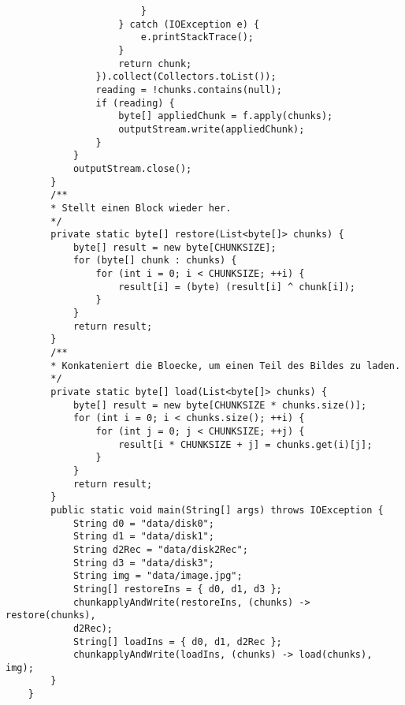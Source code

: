 \documentclass[ngerman]{fbi-aufgabenblatt}
\begin{document}
\begin{lstlisting}
						}
					} catch (IOException e) {
						e.printStackTrace();
					}
					return chunk;
				}).collect(Collectors.toList());
				reading = !chunks.contains(null);
				if (reading) {
					byte[] appliedChunk = f.apply(chunks);
					outputStream.write(appliedChunk);
				}
			}
			outputStream.close();
		}
		/**
		* Stellt einen Block wieder her.
		*/
		private static byte[] restore(List<byte[]> chunks) {
			byte[] result = new byte[CHUNKSIZE];
			for (byte[] chunk : chunks) {
				for (int i = 0; i < CHUNKSIZE; ++i) {
					result[i] = (byte) (result[i] ^ chunk[i]);
				}
			}
			return result;
		}
		/**
		* Konkateniert die Bloecke, um einen Teil des Bildes zu laden.
		*/
		private static byte[] load(List<byte[]> chunks) {
			byte[] result = new byte[CHUNKSIZE * chunks.size()];
			for (int i = 0; i < chunks.size(); ++i) {
				for (int j = 0; j < CHUNKSIZE; ++j) {
					result[i * CHUNKSIZE + j] = chunks.get(i)[j];
				}
			}
			return result;
		}
		public static void main(String[] args) throws IOException {
			String d0 = "data/disk0";
			String d1 = "data/disk1";
			String d2Rec = "data/disk2Rec";
			String d3 = "data/disk3";
			String img = "data/image.jpg";
			String[] restoreIns = { d0, d1, d3 };
			chunkapplyAndWrite(restoreIns, (chunks) -> restore(chunks),
			d2Rec);
			String[] loadIns = { d0, d1, d2Rec };
			chunkapplyAndWrite(loadIns, (chunks) -> load(chunks), img);
		}
	}
	\end{lstlisting}
\end{document}
